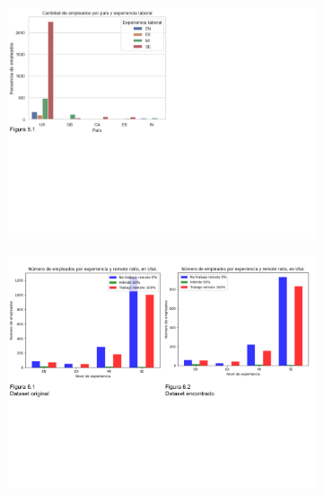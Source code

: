 \documentclass{article}
\begin{document}
	\begin{figure}[htbp] %
		\begin{subfigure}[b]{1.1\textwidth}
			\includegraphics[width=20cm]{FigurasTablas/figura5.1graficabarras.png}
			\label{figura 5.1 grafico de barras agrupado}
		\end{subfigure}
		
		\begin{subfigure}[b]{1.1\textwidth}
			\includegraphics[width=15cm]{FigurasTablas/figura6.1y6.2GraficoBarras.png}
			\label{figura6.1y6.2GraficoBarras}
		\end{subfigure}
	\end{figure}
\end{document}
